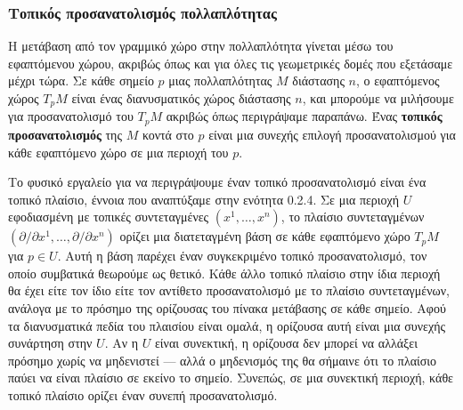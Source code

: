 \documentclass[12pt]{article}
\begin{document}
\subsubsection{Τοπικός προσανατολισμός πολλαπλότητας}

Η μετάβαση από τον γραμμικό χώρο στην πολλαπλότητα γίνεται μέσω του εφαπτόμενου χώρου, ακριβώς όπως και για όλες τις γεωμετρικές δομές που εξετάσαμε μέχρι τώρα. Σε κάθε σημείο $p$ μιας πολλαπλότητας $M$ διάστασης $n$, ο εφαπτόμενος χώρος $T_pM$ είναι ένας διανυσματικός χώρος διάστασης $n$, και μπορούμε να μιλήσουμε για προσανατολισμό του $T_pM$ ακριβώς όπως περιγράψαμε παραπάνω. Ένας \textbf{τοπικός προσανατολισμός} της $M$ κοντά στο $p$ είναι μια συνεχής επιλογή προσανατολισμού για κάθε εφαπτόμενο χώρο σε μια περιοχή του $p$.

Το φυσικό εργαλείο για να περιγράψουμε έναν τοπικό προσανατολισμό είναι ένα τοπικό πλαίσιο, έννοια που αναπτύξαμε στην ενότητα 0.2.4. Σε μια περιοχή $U$ εφοδιασμένη με τοπικές συντεταγμένες $(x^1, \dots, x^n)$, το πλαίσιο συντεταγμένων $(\partial / \partial x^1, \dots, \partial / \partial x^n)$ ορίζει μια διατεταγμένη βάση σε κάθε εφαπτόμενο χώρο $T_pM$ για $p \in U$. Αυτή η βάση παρέχει έναν συγκεκριμένο τοπικό προσανατολισμό, τον οποίο συμβατικά θεωρούμε ως θετικό. Κάθε άλλο τοπικό πλαίσιο στην ίδια περιοχή θα έχει είτε τον ίδιο είτε τον αντίθετο προσανατολισμό με το πλαίσιο συντεταγμένων, ανάλογα με το πρόσημο της ορίζουσας του πίνακα μετάβασης σε κάθε σημείο. Αφού τα διανυσματικά πεδία του πλαισίου είναι ομαλά, η ορίζουσα αυτή είναι μια συνεχής συνάρτηση στην $U$. Αν η $U$ είναι συνεκτική, η ορίζουσα δεν μπορεί να αλλάξει πρόσημο χωρίς να μηδενιστεί --- αλλά ο μηδενισμός της θα σήμαινε ότι το πλαίσιο παύει να είναι πλαίσιο σε εκείνο το σημείο. Συνεπώς, σε μια συνεκτική περιοχή, κάθε τοπικό πλαίσιο ορίζει έναν συνεπή προσανατολισμό.
\end{document}

